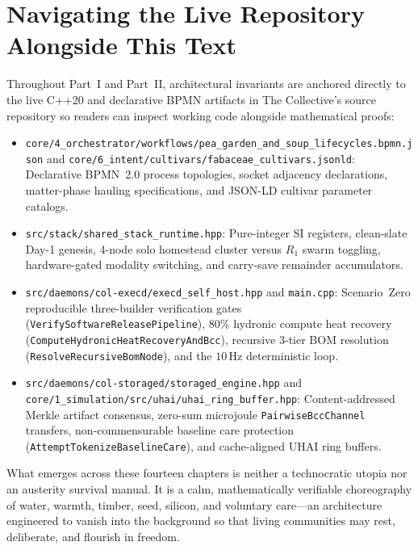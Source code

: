 \section*{Navigating the Live Repository Alongside This Text}

Throughout Part~I and Part~II, architectural invariants are anchored directly to the live
C++20 and declarative BPMN artifacts in The Collective's source repository so readers can
inspect working code alongside mathematical proofs:
\begin{itemize}
\item \texttt{core/4\_orchestrator/workflows/pea\_garden\_and\_soup\_lifecycles.bpmn.json}
        and \texttt{core/6\_intent/cultivars/fabaceae\_cultivars.jsonld}: Declarative
        BPMN~2.0 process topologies, socket adjacency declarations, matter-phase hauling
        specifications, and JSON-LD cultivar parameter catalogs.
\item \texttt{src/stack/shared\_stack\_runtime.hpp}: Pure-integer SI registers, clean-slate
        Day-1 genesis, 4-node solo homestead cluster versus $R_1$ swarm toggling,
        hardware-gated modality switching, and carry-save remainder accumulators.
\item \texttt{src/daemons/col-execd/execd\_self\_host.hpp} and \texttt{main.cpp}:
        Scenario~Zero reproducible three-builder verification gates
        (\texttt{VerifySoftwareReleasePipeline}), $80\%$ hydronic compute heat recovery
        (\texttt{ComputeHydronicHeatRecoveryAndBcc}), recursive 3-tier BOM resolution
        (\texttt{ResolveRecursiveBomNode}), and the $10\,\mathrm{Hz}$ deterministic loop.
\item \texttt{src/daemons/col-storaged/storaged\_engine.hpp} and
        \texttt{core/1\_simulation/src/uhai/uhai\_ring\_buffer.hpp}: Content-addressed
        Merkle artifact consensus, zero-sum microjoule \texttt{PairwiseBccChannel}
        transfers, non-commensurable baseline care protection
        (\texttt{AttemptTokenizeBaselineCare}), and cache-aligned UHAI ring buffers.
\end{itemize}

What emerges across these fourteen chapters is neither a technocratic utopia nor an
austerity survival manual. It is a calm, mathematically verifiable choreography of water,
warmth, timber, seed, silicon, and voluntary care---an architecture engineered to vanish
into the background so that living communities may rest, deliberate, and flourish in
freedom.
